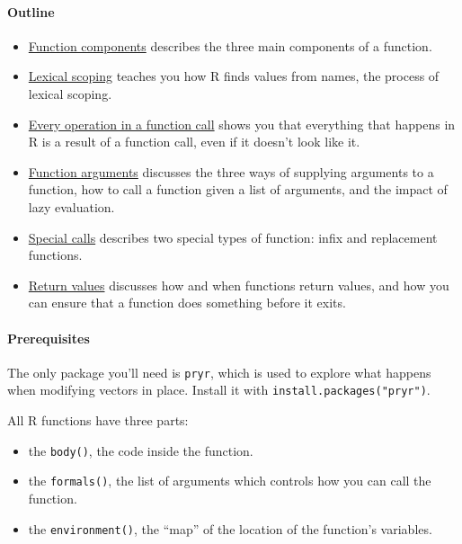 \paragraph{Outline}

\begin{itemize}
\item
  \hyperref[function-components]{Function components} describes the
  three main components of a function.
\item
  \hyperref[lexical-scoping]{Lexical scoping} teaches you how R finds
  values from names, the process of lexical scoping.
\item
  \hyperref[all-calls]{Every operation in a function call} shows you
  that everything that happens in R is a result of a function call, even
  if it doesn't look like it.
\item
  \hyperref[function-arguments]{Function arguments} discusses the three
  ways of supplying arguments to a function, how to call a function
  given a list of arguments, and the impact of lazy evaluation.
\item
  \hyperref[special-calls]{Special calls} describes two special types of
  function: infix and replacement functions.
\item
  \hyperref[return-values]{Return values} discusses how and when
  functions return values, and how you can ensure that a function does
  something before it exits.
\end{itemize}

\paragraph{Prerequisites}

The only package you'll need is \texttt{pryr}, which is used to explore
what happens when modifying vectors in place. Install it with
\texttt{install.packages("pryr")}.


All R functions have three parts: 
 

\begin{itemize}
\item
  the \texttt{body()}, the code inside the function.
\item
  the \texttt{formals()}, the list of arguments which controls how you
  can call the function.
\item
  the \texttt{environment()}, the ``map'' of the location of the
  function's variables.
\end{itemize}

